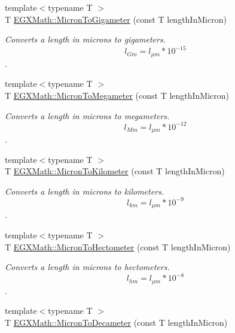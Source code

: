 \begin{DoxyCompactItemize}
{\footnotesize template$<$typename T $>$ }\\T \mbox{\hyperlink{group___e_g_x_math-_conversions-_length_conversions-_non-_s_i-_micron-_s_i_ga412ce50d9e2bf7647e420e4f6365f9a2}{E\+G\+X\+Math\+::\+Micron\+To\+Gigameter}} (const T length\+In\+Micron)
\begin{DoxyCompactList}\small\item\em Converts a length in microns to gigameters. \[ l_{Gm}=l_{\mu m} * 10^{-15} \]. \end{DoxyCompactList}\item 
{\footnotesize template$<$typename T $>$ }\\T \mbox{\hyperlink{group___e_g_x_math-_conversions-_length_conversions-_non-_s_i-_micron-_s_i_ga044475633903b9766ffd7685e7198600}{E\+G\+X\+Math\+::\+Micron\+To\+Megameter}} (const T length\+In\+Micron)
\begin{DoxyCompactList}\small\item\em Converts a length in microns to megameters. \[ l_{Mm}=l_{\mu m} * 10^{-12} \]. \end{DoxyCompactList}\item 
{\footnotesize template$<$typename T $>$ }\\T \mbox{\hyperlink{group___e_g_x_math-_conversions-_length_conversions-_non-_s_i-_micron-_s_i_ga32266166f54e31b9dde1c47155dcb4ad}{E\+G\+X\+Math\+::\+Micron\+To\+Kilometer}} (const T length\+In\+Micron)
\begin{DoxyCompactList}\small\item\em Converts a length in microns to kilometers. \[ l_{km}=l_{\mu m} * 10^{-9} \]. \end{DoxyCompactList}\item 
{\footnotesize template$<$typename T $>$ }\\T \mbox{\hyperlink{group___e_g_x_math-_conversions-_length_conversions-_non-_s_i-_micron-_s_i_gae1509e20f2617b926b3a0f2fef2e4d0a}{E\+G\+X\+Math\+::\+Micron\+To\+Hectometer}} (const T length\+In\+Micron)
\begin{DoxyCompactList}\small\item\em Converts a length in microns to hectometers. \[ l_{hm}=l_{\mu m} * 10^{-8} \]. \end{DoxyCompactList}\item 
{\footnotesize template$<$typename T $>$ }\\T \mbox{\hyperlink{group___e_g_x_math-_conversions-_length_conversions-_non-_s_i-_micron-_s_i_gab41e5d3a8f679f0e476fbd7bf2c6dcc7}{E\+G\+X\+Math\+::\+Micron\+To\+Decameter}} (const T length\+In\+Micron)

\end{DoxyCompactItemize}
